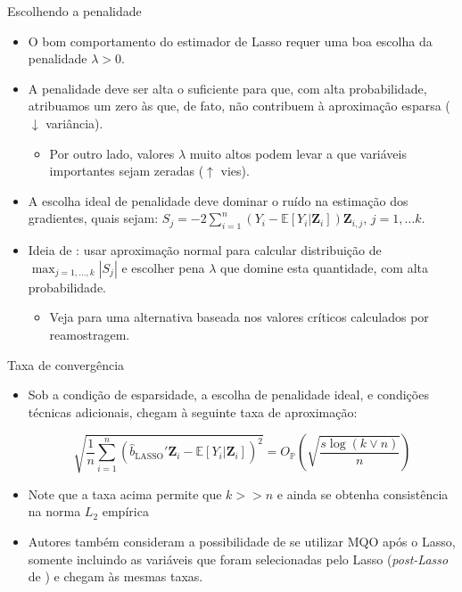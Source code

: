 \documentclass[11pt]{beamer}
\begin{document}
\begin{frame}{Escolhendo a penalidade}
\begin{itemize}
	\item  O bom comportamento do estimador de Lasso requer uma boa escolha da penalidade $\lambda > 0$.
\item A penalidade deve ser alta o suficiente para que, com alta probabilidade, atribuamos um zero às que, de fato, não contribuem à aproximação esparsa ($\downarrow $ variância).
\begin{itemize}
	\item Por outro lado, valores $\lambda$ muito altos podem levar a que variáveis importantes sejam zeradas ($\uparrow$ vies).
\end{itemize}
\item A escolha ideal de penalidade deve dominar o ruído na estimação dos gradientes, quais sejam: $S_j = - 2 \sum_{i=1}^n (Y_i-\mathbb{E}[Y_i|\boldsymbol{Z}_i]) \boldsymbol{Z}_{i,j}$, $j=1,\ldots k$.
\item Ideia de \citet{Belloni2012}: usar aproximação normal para calcular distribuição de $\max_{j=1,\ldots, k} |S_j| $ e escolher pena $\lambda$ que domine esta quantidade, com alta probabilidade.
\begin{itemize}
	\item Veja \citet{chetverikov2021selecting} para uma alternativa baseada nos valores críticos calculados por reamostragem.
\end{itemize}
\end{itemize}
\end{frame}

\begin{frame}{Taxa de convergência}
	\begin{itemize}
		\item Sob a condição de esparsidade, a escolha de penalidade ideal, e condições técnicas adicionais, \citet{Belloni2012} chegam à seguinte taxa de aproximação:
		
		$$\sqrt{\frac{1}{n}\sum_{i=1}^n (\hat{b}_{\text{LASSO}}'\boldsymbol{Z}_i - \mathbb{E}[Y_i|\boldsymbol{Z}_i])^2}  = O_{\mathbb{P}}\left(\sqrt{\frac{s \log(k\lor n)}{n}}\right)$$
		\item Note que a taxa acima permite que $k >> n$ e ainda se obtenha consistência na norma $L_2$ empírica
		\item Autores também consideram a possibilidade de se utilizar MQO após o Lasso, somente incluindo as variáveis que foram selecionadas pelo Lasso (\textit{post-Lasso} de \cite{Belloni2013}) e chegam às mesmas taxas.
	\end{itemize}
\end{frame}
\end{document}
